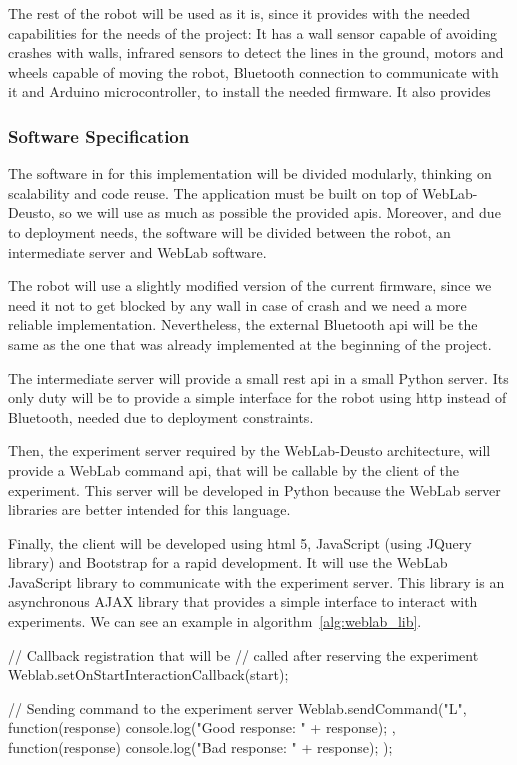 The rest of the robot will be used as it is, since it provides with the needed capabilities for the
needs of the project: It has a wall sensor capable of avoiding crashes with walls, infrared sensors
to detect the lines in the ground, motors and wheels capable of moving the robot, Bluetooth
connection to communicate with it and Arduino microcontroller, to install the needed firmware. It
also provides

\subsubsection{Software Specification}

The software in for this implementation will be divided modularly, thinking on scalability and
code reuse. The application must be built on top of WebLab-Deusto, so we will use as much as
possible the provided \acrshort{api}s. Moreover, and due to deployment needs, the software will be
divided between the robot, an intermediate server and WebLab software.

The robot will use a slightly modified version of the current firmware, since we need it not to get
blocked by any wall in case of crash and we need a more reliable implementation. Nevertheless, the
external Bluetooth \acrshort{api} will be the same as the one that was already implemented at the
beginning of the project.

The intermediate server will provide a small \acrshort{rest} \acrshort{api} in a small Python
server. Its only duty will be to provide a simple interface for the robot using \acrshort{http}
instead of Bluetooth, needed due to deployment constraints.

Then, the experiment server required by the WebLab-Deusto architecture, will provide a WebLab
command \acrshort{api}, that will be callable by the client of the experiment. This server will be
developed in Python because the WebLab server libraries are better intended for this language.

Finally, the client will be developed using \acrshort{html} 5, JavaScript (using JQuery library) and
Bootstrap for a rapid development. It will use the WebLab JavaScript library to communicate with the
experiment server. This library is an asynchronous AJAX library that provides a simple interface to
interact with experiments. We can see an example in algorithm~\ref{alg:weblab_lib}.

\begin{center}
\begin{minipage}{.6\textwidth}
\singlespace
\begin{pyglist}[language=javascript, caption={WebLab JavaScript library example.},
	label={alg:weblab_lib}, listingname={Algorithm}, numbers=left]
// Callback registration that will be
// called after reserving the experiment
Weblab.setOnStartInteractionCallback(start);

// Sending command to the experiment server
Weblab.sendCommand("L", function(response) {
    console.log("Good response: " + response);
}, function(response) {
    console.log("Bad response: " + response);
});
\end{pyglist}
\end{minipage}
\end{center}

